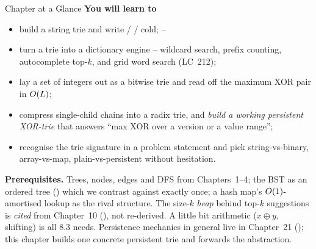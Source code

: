 \begin{chaptertheorybox}{Chapter at a Glance}
\textbf{You will learn to}
\begin{itemize}[nosep]
  \item build a string trie and write  /  /  cold; \hfill{}--
  \item turn a trie into a dictionary engine -- wildcard search, prefix counting, autocomplete top-$k$,
        and grid word search (LC~212); \hfill{}
  \item lay a set of integers out as a bitwise trie and read off the maximum XOR pair in $O(L)$; \hfill{}
  \item compress single-child chains into a radix trie, and \emph{build a working persistent XOR-trie}
        that answers ``max XOR over a version or a value range''; \hfill{}
  \item recognise the trie signature in a problem statement and pick string-vs-binary, array-vs-map,
        plain-vs-persistent without hesitation. \hfill{}
\end{itemize}

\textbf{Prerequisites.} Trees, nodes, edges and DFS from Chapters~1--4; the BST as an ordered tree
() which we contrast against exactly once; a hash map's $O(1)$-amortised lookup as the
rival structure. The size-$k$ \emph{heap} behind top-$k$ suggestions is \emph{cited} from
Chapter~10 (), not re-derived. A little bit arithmetic ($x\oplus y$, shifting) is all 8.3
needs. Persistence mechanics in general live in Chapter~21 (); this chapter builds one
concrete persistent trie and forwards the abstraction.
\end{chaptertheorybox}

